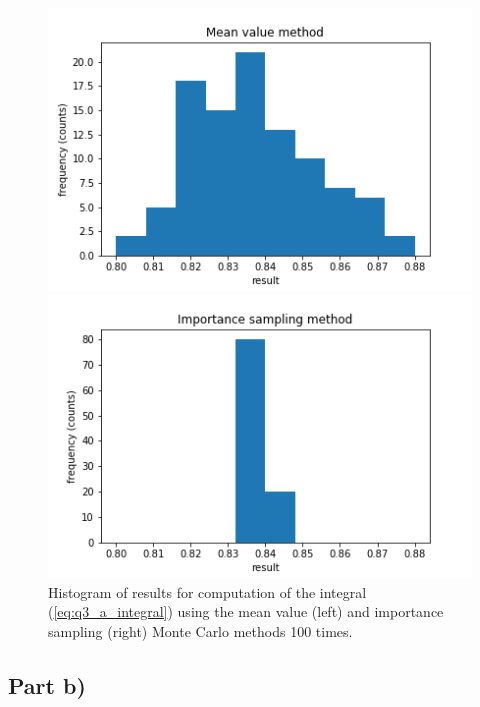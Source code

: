 \documentclass{article}
\begin{document}
\begin{figure}[H]
	\centering
	\begin{minipage}{0.49\linewidth}
		\includegraphics[width=\linewidth]{../images/q3_a_mv.png}
	\end{minipage}
	\begin{minipage}{0.49\linewidth}
		\includegraphics[width=\linewidth]{../images/q3_a_is.png}
	\end{minipage}
	\caption{Histogram of results for computation of the integral (\ref{eq:q3_a_integral}) using the mean value (left) and importance sampling (right) Monte Carlo methods 100 times.}
	\label{fig:q3_a}
\end{figure}

\subsection{Part b)}
\end{document}
